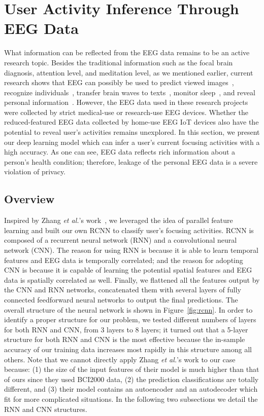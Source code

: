 \section{User Activity Inference Through EEG Data}
\label{sec:inference}

What information can be reflected from the EEG data remains to be an active research topic. Besides the traditional information such as the focal brain diagnosis, attention level, and meditation level, as we mentioned earlier, current research shows that EEG can possibly be used to predict viewed images~\cite{mindreading2017}, recognize individuals~\cite{chu2017individual}, transfer brain waves to texts~\cite{zhang2017converting}, monitor sleep~\cite{nakamura2017automatic},  and reveal personal information~\cite{martinovic2012feasibility}. However, the EEG data used in these research projects were collected by strict medical-use or research-use EEG devices. Whether the reduced-featured EEG data collected by home-use EEG IoT devices also have the potential to reveal user's activities remains unexplored. In this section, we present our deep learning model which can infer a user's current focusing activities with a high accuracy. As one can see, EEG data reflects rich information about a person's health condition; therefore, leakage of the personal EEG data is a severe violation of privacy.

\subsection{Overview}
Inspired by Zhang \emph{et al.}'s work~\cite{zhang2017converting,hochreiter1997long}, we leveraged the idea of parallel feature learning and built our own RCNN to classify user's focusing activities. RCNN is composed of a recurrent neural network (RNN) and a convolutional neural network (CNN). The reason for using RNN is because it is able to learn temporal features and EEG data is temporally correlated; and the reason for adopting CNN is because it is capable of learning the potential spatial features and EEG data is spatially correlated as well. Finally, we flattened all the features output by the CNN and RNN networks, concatenated them with several layers of fully connected feedforward neural networks to output the final predictions. The overall structure of the neural network is shown in Figure~\ref{fig:rcnn}. In order to identify a proper structure for our problem, we tested different numbers of layers for both RNN and CNN, from 3 layers to 8 layers; it turned out that a 5-layer structure for both RNN and CNN is the most effective because the in-sample accuracy of our training data increases most rapidly in this structure among all others. Note that we cannot directly apply Zhang \emph{et al.}'s work to our case because: (1) the size of the input features of their model is much higher than that of ours since they used BCI2000 data, (2) the prediction classifications are totally different, and (3) their model contains an autoencoder and an autodecoder which fit for more complicated situations. %
In the following two subsections we detail the RNN and CNN structures. 

